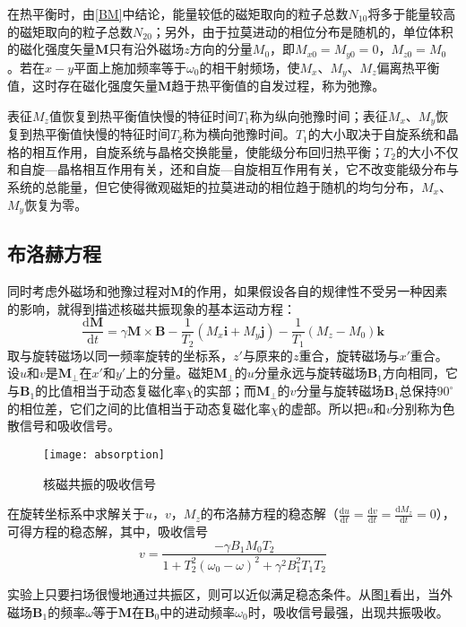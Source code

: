 \documentclass[aps,pre,12pt,preprint,onecolumn,showpacs,showkeys]{revtex4-1}
\def \d {\mathrm d}
\def \degree {^\circ}
\begin{document}
在热平衡时，由\ref{BM}中结论，能量较低的磁矩取向的粒子总数$N_{10}$将多于能量较高的磁矩取向的粒子总数$N_{20}$；另外，由于拉莫进动的相位分布是随机的，单位体积的磁化强度矢量$\bm{M}$只有沿外磁场$z$方向的分量$M_0$，即$M_{x0}=M_{y0}=0$，$M_{z0}=M_0$。若在$x-y$平面上施加频率等于$\omega_0$的相干射频场，使$M_x$、$M_y$、$M_z$偏离热平衡值，这时存在磁化强度矢量$\bm{M}$趋于热平衡值的自发过程，称为弛豫。

表征$M_z$值恢复到热平衡值快慢的特征时间$T_1$称为纵向弛豫时间；表征$M_x$、$M_y$恢复到热平衡值快慢的特征时间$T_2$称为横向弛豫时间。$T_1$的大小取决于自旋系统和晶格的相互作用，自旋系统与晶格交换能量，使能级分布回归热平衡；$T_2$的大小不仅和自旋—晶格相互作用有关，还和自旋—自旋相互作用有关，它不改变能级分布与系统的总能量，但它使得微观磁矩的拉莫进动的相位趋于随机的均匀分布，$M_x$、$M_y$恢复为零。

\subsection{布洛赫方程}
同时考虑外磁场和弛豫过程对$\bm{M}$的作用，如果假设各自的规律性不受另一种因素的影响，就得到描述核磁共振现象的基本运动方程：
\begin{equation}
\frac{\d \bm{M}}{\d t}=\gamma \bm{M}\times \bm{B} -\frac{1}{T_2}(M_x \bm{i}+M_y \bm{j})-\frac{1}{T_1}(M_z-M_0) \bm{k}
\end{equation}
取与旋转磁场以同一频率旋转的坐标系，$z'$与原来的$z$重合，旋转磁场与$x'$重合。设$u$和$v$是$\bm{M}_\perp$在$x'$和$y'$上的分量。磁矩$\bm{M}_{\perp}$的$u$分量永远与旋转磁场$\bm{B}_1$方向相同，它与$\bm{B}_1$的比值相当于动态复磁化率$\chi$的实部；而$\bm{M}_\perp$的$v$分量与旋转磁场$\bm{B}_1$总保持$90\degree$的相位差，它们之间的比值相当于动态复磁化率$\chi$的虚部。所以把$u$和$v$分别称为色散信号和吸收信号。
\begin{figure}[h]
\centering
\texttt{[image: absorption]}
\caption{\label{fig:absorption}%
核磁共振的吸收信号}
\end{figure}

在旋转坐标系中求解关于$u$，$v$，$M_z$的布洛赫方程的稳态解（$\frac{\d u}{\d t}=\frac{\d v}{\d t}=\frac{\d M_z}{\d t}=0$），可得方程的稳态解，其中，吸收信号
\begin{equation}
v=\frac{-\gamma B_1 M_0 T_2}{1+T_2^2(\omega_0-\omega)^2+\gamma^2 B_1^2 T_1 T_2}\label{eq:absorption}
\end{equation}

实验上只要扫场很慢地通过共振区，则可以近似满足稳态条件。从图\ref{fig:absorption}看出，当外磁场$\bm{B}_1$的频率$\omega$等于$\bm{M}$在$\bm{B}_0$中的进动频率$\omega_0$时，吸收信号最强，出现共振吸收。
\end{document}
